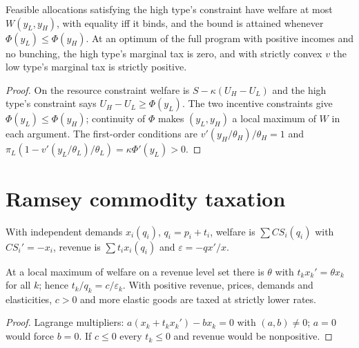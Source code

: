 \begin{theorem}
\label{thm:mirrlees2}
\leanok
{}
Feasible allocations satisfying the high type's constraint have welfare at most $W(y_L,y_H)$, with equality iff it binds, and
the bound is attained whenever $\Phi(y_L)\le\Phi(y_H)$. At an optimum of the full program with positive incomes and no bunching,
the high type's marginal tax is zero, and with strictly convex $v$ the low type's marginal tax is strictly positive.
\end{theorem}
\begin{proof}
\leanok
On the resource constraint welfare is $S-\kappa(U_H-U_L)$ and the high type's constraint says $U_H-U_L\ge\Phi(y_L)$. The two
incentive constraints give $\Phi(y_L)\le\Phi(y_H)$; continuity of $\Phi$ makes $(y_L,y_H)$ a local maximum of $W$ in each argument.
The first-order conditions are $v'(y_H/\theta_H)/\theta_H=1$ and
$\pi_L(1-v'(y_L/\theta_L)/\theta_L)=\kappa\Phi'(y_L)>0$.
\end{proof}

\section{Ramsey commodity taxation}

\begin{definition}
\label{def:ramsey_tax}
\leanok
With independent demands $x_i(q_i)$, $q_i=p_i+t_i$, welfare is $\sum CS_i(q_i)$ with $CS_i'=-x_i$, revenue is
$\sum t_ix_i(q_i)$ and $\varepsilon=-qx'/x$.
\end{definition}

\begin{theorem}
\label{thm:ramsey_tax}
\leanok
{}
At a local maximum of welfare on a revenue level set there is $\theta$ with $t_kx_k'=\theta x_k$ for all $k$; hence
$t_k/q_k=c/\varepsilon_k$. With positive revenue, prices, demands and elasticities, $c>0$ and more elastic goods are taxed at
strictly lower rates.
\end{theorem}
\begin{proof}
\leanok
Lagrange multipliers: $a(x_k+t_kx_k')-bx_k=0$ with $(a,b)\ne0$; $a=0$ would force $b=0$. If $c\le0$ every $t_k\le0$ and
revenue would be nonpositive.
\end{proof}

